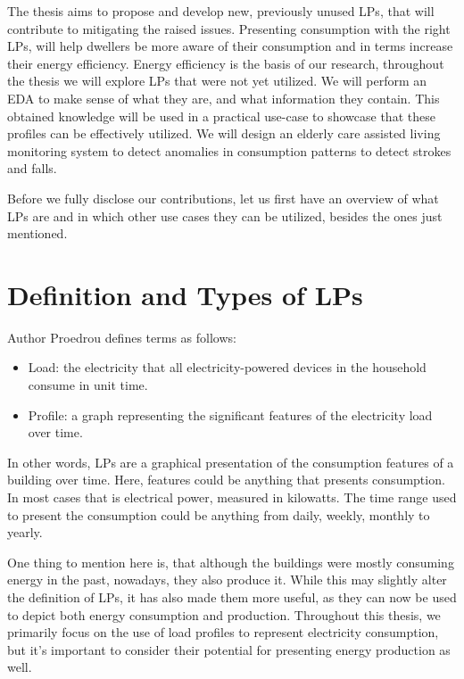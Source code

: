 The thesis aims to propose and develop new, previously unused LPs, that will contribute to mitigating the raised issues.
Presenting consumption with the right LPs, will help dwellers be more aware of their consumption and in terms increase their energy efficiency.
Energy efficiency is the basis of our research, throughout the thesis we will explore LPs that were not yet utilized.
We will perform an EDA to make sense of what they are, and what information they contain.
This obtained knowledge will be used in a practical use-case to showcase that these profiles can be effectively utilized.
We will design an elderly care assisted living monitoring system to detect anomalies in consumption patterns to detect strokes and falls.

Before we fully disclose our contributions, let us first have an overview of what LPs are and in which other use cases they can be utilized, besides the ones just mentioned.


\section{Definition and Types of LPs}
\label{sec:LP_types}
Author Proedrou \cite{Review2021} defines terms as follows:


\begin{itemize}
	\item Load: the electricity that all electricity-powered devices in the household consume in unit time.
	\item Profile: a graph representing the significant features of the electricity load over time.
\end{itemize}

In other words, LPs are a graphical presentation of the consumption features of a building over time. 
Here, features could be anything that presents consumption. 
In most cases that is electrical power, measured in kilowatts.
The time range used to present the consumption could be anything from daily, weekly, monthly to yearly.

One thing to mention here is, that although the buildings were mostly consuming energy in the past, nowadays, they also produce it.
While this may slightly alter the definition of LPs, it has also made them more useful, as they can now be used to depict both energy consumption and production.
Throughout this thesis, we primarily focus on the use of load profiles to represent electricity consumption, but it's important to consider their potential for presenting energy production as well.

